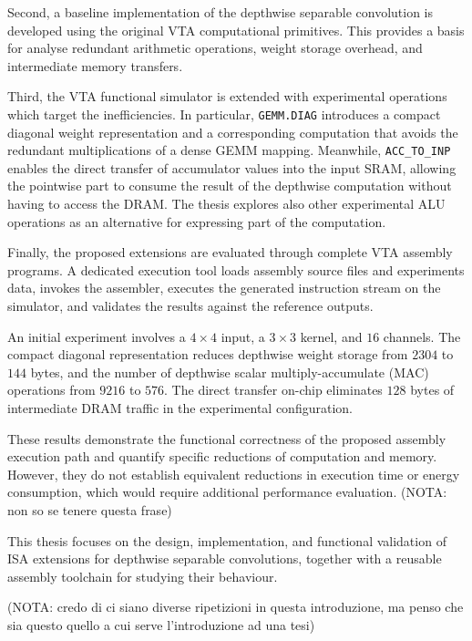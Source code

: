 \documentclass[oneside, binding=0.6cm]{sapthesis}
\begin{document}
	Second, a baseline implementation of the depthwise separable convolution is developed using the original \gls{VTA} computational primitives. This provides a basis for analyse redundant arithmetic operations, weight storage overhead, and intermediate memory transfers.
	
	Third, the VTA functional simulator is extended with experimental operations which target the inefficiencies. In particular, \texttt{GEMM.DIAG} introduces a compact diagonal weight representation and a corresponding computation that avoids the redundant multiplications of a dense \gls{GEMM} mapping. Meanwhile, \texttt{ACC\_TO\_INP} enables the direct transfer of accumulator values into the input SRAM, allowing the pointwise part to consume the result of the depthwise computation without having to access the DRAM. 
	The thesis explores also other experimental \gls{ALU} operations as an alternative for expressing part of the computation.
	
	Finally, the proposed extensions are evaluated through complete \gls{VTA} assembly programs. A dedicated execution tool loads assembly source files and experiments data, invokes the assembler, executes the generated instruction stream on the simulator, and validates the results against the reference outputs.
		
	An initial experiment involves a $4 \times 4$ input, a $3 \times 3$ kernel, and $16$ channels. The compact diagonal representation reduces depthwise weight storage from $2304$ to $144$ bytes, and the number of depthwise scalar multiply-accumulate (\gls{MAC}) operations from $9216$ to $576$.
	The direct transfer on-chip eliminates $128$ bytes of intermediate DRAM traffic in the experimental configuration.
	
	These results demonstrate the functional correctness of the proposed assembly execution path and quantify specific reductions of computation and memory. However, they do not establish equivalent reductions in execution time or energy consumption, which would require additional performance evaluation. (NOTA: non so se tenere questa frase)
	
	This thesis focuses on the design, implementation, and functional validation of \gls{ISA} extensions for depthwise separable convolutions, together with a reusable assembly toolchain for studying their behaviour.		
	
	(NOTA: credo di ci siano diverse ripetizioni in questa introduzione, ma penso che sia questo quello a cui serve l'introduzione ad una tesi)
	
		
	\clearpage
	
	
	
	
	
	\backmatter
 	
	
	\cleardoublepage
\end{document}
